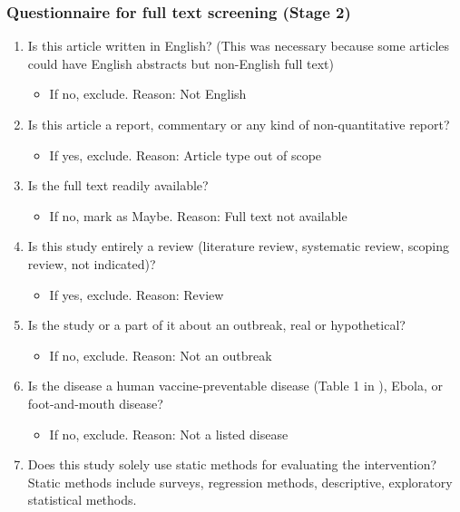 \documentclass[10pt,letterpaper]{article}
\begin{document}
\subsubsection*{Questionnaire for full text screening (Stage 2)}
\begin{enumerate}
	\item Is this article written in English? (This was necessary because some articles could have English abstracts but non-English full text)
	\begin{itemize}
		\item 	If no, exclude. Reason: Not English	
	\end{itemize}
	\item Is this article a report, commentary or any kind of non-quantitative report?
	\begin{itemize}
		\item 	If yes, exclude. Reason: Article type out of scope
	\end{itemize}
	\item Is the full text readily available?
	\begin{itemize}
		\item 	If no, mark as Maybe. Reason: Full text not available	
	\end{itemize}
	\item Is this study entirely a review (literature review, systematic review, scoping review, not indicated)? 
	\begin{itemize}
		\item 	If yes, exclude. Reason: Review
	\end{itemize}
	\item Is the study or a part of it about an outbreak, real or hypothetical?
	\begin{itemize}
		\item 	If no, exclude. Reason: Not an outbreak
	\end{itemize}
	\item Is the disease a human vaccine-preventable disease (Table 1 in ), Ebola, or foot-and-mouth disease? 
	\begin{itemize}
		\item 	If no, exclude. Reason: Not a listed disease
	\end{itemize}
	\item Does this study solely use static methods for evaluating the intervention? Static methods include surveys, regression methods, descriptive, exploratory statistical methods.
	\begin{itemize}

\end{itemize}
\end{enumerate}
\end{document}
